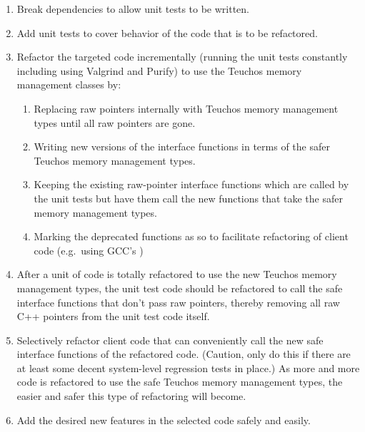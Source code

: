 \documentclass[pdf,ps2pdf,11pt]{SANDreport}
\begin{document}
\begin{enumerate}

{}\item Break dependencies to allow unit tests to be written.

{}\item Add unit tests to cover behavior of the code that is to be
refactored.

{}\item Refactor the targeted code incrementally (running the unit
tests constantly including using Valgrind and Purify) to use the
Teuchos memory management classes by:

  \begin{enumerate}

  {}\item Replacing raw pointers internally with Teuchos memory
  management types until all raw pointers are gone.

  {}\item Writing new versions of the interface functions in terms of
  the safer Teuchos memory management types.

  {}\item Keeping the existing raw-pointer interface functions which
  are called by the unit tests but have them call the new functions
  that take the safer memory management types.

  {}\item Marking the deprecated functions as so to facilitate
  refactoring of client code (e.g.\ using GCC's {})

  \end{enumerate}

{}\item After a unit of code is totally refactored to use the new
Teuchos memory management types, the unit test code should be
refactored to call the safe interface functions that don't pass raw
pointers, thereby removing all raw C++ pointers from the unit test
code itself.

{}\item Selectively refactor client code that can conveniently call
the new safe interface functions of the refactored code.  (Caution,
only do this if there are at least some decent system-level regression
tests in place.)  As more and more code is refactored to use the safe
Teuchos memory management types, the easier and safer this type of
refactoring will become.

{}\item Add the desired new features in the selected code safely and
easily.

\end{enumerate}
\end{document}
